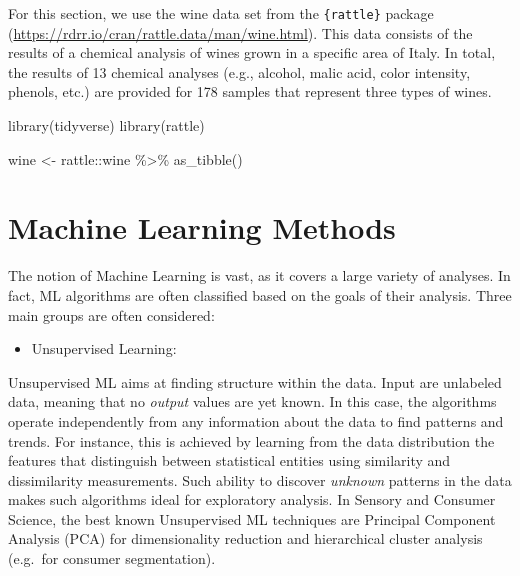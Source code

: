 \documentclass[
]{krantz}
\makeatletter
\newenvironment{Shaded}{\begin{snugshade}}{\end{snugshade}}
\newcommand{\FunctionTok}[1]{\textcolor[rgb]{0,0,0}{#1}}
\newcommand{\NormalTok}[1]{#1}
\newcommand{\OtherTok}[1]{\textcolor[rgb]{0.37,0.37,0.37}{#1}}
\newcommand{\SpecialCharTok}[1]{\textcolor[rgb]{0,0,0}{#1}}
\providecommand{\tightlist}{%
  \setlength{\itemsep}{0pt}\setlength{\parskip}{0pt}}
\newenvironment{kframe}{%
\medskip{}
\setlength{\fboxsep}{.8em}
 \def\at@end@of@kframe{}%
 \ifinner\ifhmode%
  \def\at@end@of@kframe{\end{minipage}}%
  \begin{minipage}{\columnwidth}%
 \fi\fi%
 \def\FrameCommand##1{\hskip\@totalleftmargin \hskip-\fboxsep
 \colorbox{shadecolor}{##1}\hskip-\fboxsep
     \hskip-\linewidth \hskip-\@totalleftmargin \hskip\columnwidth}%
 \MakeFramed {\advance\hsize-\width
   \@totalleftmargin\z@ \linewidth\hsize
   \@setminipage}}%
 {\par\unskip\endMakeFramed%
 \at@end@of@kframe}
\renewenvironment{Shaded}{\begin{kframe}}{\end{kframe}}
\makeatother
\begin{document}
For this section, we use the wine data set from the \texttt{\{rattle\}} package (\url{https://rdrr.io/cran/rattle.data/man/wine.html}). This data consists of the results of a chemical analysis of wines grown in a specific area of Italy. In total, the results of 13 chemical analyses (e.g., alcohol, malic acid, color intensity, phenols, etc.) are provided for 178 samples that represent three types of wines.

\begin{Shaded}
\begin{Highlighting}[]
\FunctionTok{library}\NormalTok{(tidyverse)}
\FunctionTok{library}\NormalTok{(rattle)}

\NormalTok{wine }\OtherTok{\textless{}{-}}\NormalTok{ rattle}\SpecialCharTok{::}\NormalTok{wine }\SpecialCharTok{\%\textgreater{}\%} 
  \FunctionTok{as\_tibble}\NormalTok{()}
\end{Highlighting}
\end{Shaded}

\hypertarget{machine-learning-methods}{%
\section{Machine Learning Methods}\label{machine-learning-methods}}

The notion of Machine Learning is vast, as it covers a large variety of analyses. In fact, ML algorithms are often classified based on the goals of their analysis. Three main groups are often considered:

\begin{itemize}
\tightlist
\item
  Unsupervised Learning:
\end{itemize}

Unsupervised ML aims at finding structure within the data. Input are unlabeled data, meaning that no \emph{output} values are yet known. In this case, the algorithms operate independently from any information about the data to find patterns and trends. For instance, this is achieved by learning from the data distribution the features that distinguish between statistical entities using similarity and dissimilarity measurements.
Such ability to discover \emph{unknown} patterns in the data makes such algorithms ideal for exploratory analysis. In Sensory and Consumer Science, the best known Unsupervised ML techniques are Principal Component Analysis (PCA) for dimensionality reduction and hierarchical cluster analysis (e.g.~for consumer segmentation).
\end{document}
